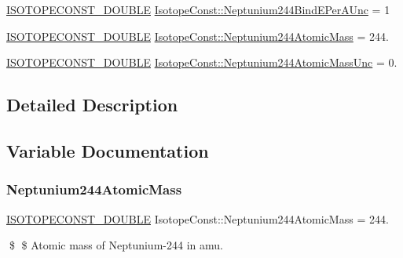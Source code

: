 \begin{DoxyCompactItemize}
\mbox{\hyperlink{group___isotope_const-_macros_ga8f45a7272ce02c0b4c65c44636ed719a}{I\+S\+O\+T\+O\+P\+E\+C\+O\+N\+S\+T\+\_\+\+D\+O\+U\+B\+LE}} \mbox{\hyperlink{group___isotope_const-_neptunium-_np244_gac1c97a6aee53deb78e51cbc1e67580a6}{Isotope\+Const\+::\+Neptunium244\+Bind\+E\+Per\+A\+Unc}} = 1
\item 
\mbox{\hyperlink{group___isotope_const-_macros_ga8f45a7272ce02c0b4c65c44636ed719a}{I\+S\+O\+T\+O\+P\+E\+C\+O\+N\+S\+T\+\_\+\+D\+O\+U\+B\+LE}} \mbox{\hyperlink{group___isotope_const-_neptunium-_np244_ga31971b1a147d4ba73f76be045108e9d9}{Isotope\+Const\+::\+Neptunium244\+Atomic\+Mass}} = 244.
\item 
\mbox{\hyperlink{group___isotope_const-_macros_ga8f45a7272ce02c0b4c65c44636ed719a}{I\+S\+O\+T\+O\+P\+E\+C\+O\+N\+S\+T\+\_\+\+D\+O\+U\+B\+LE}} \mbox{\hyperlink{group___isotope_const-_neptunium-_np244_ga01fa0ed8eed95a5641fff46f51181083}{Isotope\+Const\+::\+Neptunium244\+Atomic\+Mass\+Unc}} = 0.
\end{DoxyCompactItemize}


\subsection{Detailed Description}


\subsection{Variable Documentation}
\mbox{\label{group___isotope_const-_neptunium-_np244_ga31971b1a147d4ba73f76be045108e9d9}} 
\subsubsection{\texorpdfstring{Neptunium244\+Atomic\+Mass}{Neptunium244AtomicMass}}
{\footnotesize\ttfamily \mbox{\hyperlink{group___isotope_const-_macros_ga8f45a7272ce02c0b4c65c44636ed719a}{I\+S\+O\+T\+O\+P\+E\+C\+O\+N\+S\+T\+\_\+\+D\+O\+U\+B\+LE}} Isotope\+Const\+::\+Neptunium244\+Atomic\+Mass = 244.}

\$ \$ Atomic mass of Neptunium-\/244 in amu. \mbox{\label{group___isotope_const-_neptunium-_np244_ga01fa0ed8eed95a5641fff46f51181083}} 

